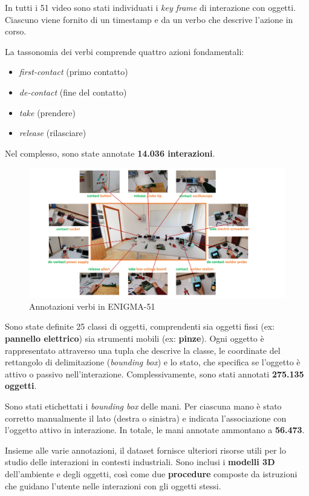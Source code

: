 In tutti i 51 video sono stati individuati i \emph{key frame} di interazione con oggetti. Ciascuno viene fornito di un timestamp e da un verbo che descrive l'azione in corso.  

La tassonomia dei verbi comprende quattro azioni fondamentali:  
\begin{itemize}
    \item \emph{first-contact} (primo contatto)  
    \item \emph{de-contact} (fine del contatto)  
    \item \emph{take} (prendere)  
    \item \emph{release} (rilasciare)  
\end{itemize}

Nel complesso, sono state annotate \textbf{14.036 interazioni}.

\begin{figure}[ht]
    \centering
    \includegraphics[width=1\linewidth]{Images/enigma_verbs.png}
    \caption{Annotazioni verbi in ENIGMA-51}
\end{figure}

Sono state definite 25 classi di oggetti, comprendenti sia oggetti fissi (ex: \textbf{pannello elettrico}) sia strumenti mobili (ex: \textbf{pinze}).  
Ogni oggetto è rappresentato attraverso una tupla che descrive la classe, le coordinate del rettangolo di delimitazione (\emph{bounding box}) e lo stato, che specifica se l'oggetto è attivo o passivo nell'interazione.  
Complessivamente, sono stati annotati \textbf{275.135 oggetti}.  

Sono stati etichettati i \emph{bounding box} delle mani.  
Per ciascuna mano è stato corretto manualmente il lato (destra o sinistra) e indicata l'associazione con l'oggetto attivo in interazione.  
In totale, le mani annotate ammontano a \textbf{56.473}.

Insieme alle varie annotazioni, il dataset fornisce ulteriori risorse utili per lo studio delle interazioni in contesti industriali.  
Sono inclusi i \textbf{modelli 3D} dell'ambiente e degli oggetti, così come due \textbf{procedure} composte da istruzioni che guidano l'utente nelle interazioni con gli oggetti stessi.

